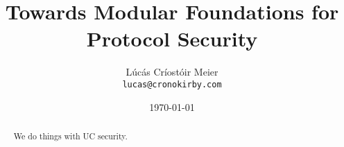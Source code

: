

\date{\today}
\title{Towards Modular Foundations for\\ Protocol Security}
\author{Lúcás Críostóir Meier\\\texttt{lucas@cronokirby.com}}



\maketitle

\begin{abstract}
    We do things with UC security.
\end{abstract}











{\small }
\clearpage
\appendix


